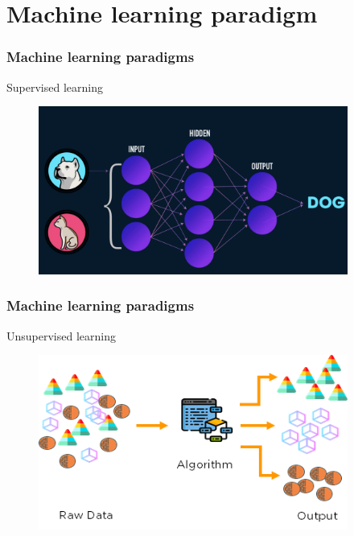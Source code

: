 \documentclass{beamer}
\begin{document}
\section{Machine learning paradigm}
\begin{frame}
\frametitle{Machine learning paradigms}
\begin{block}{Supervised learning}
\begin{figure}[H] %
   \centering
   \includegraphics[width=4in]{figures/supervise-learning.png} 
\end{figure}
\end{block}
\end{frame}
\begin{frame}
\frametitle{Machine learning paradigms}
\begin{block}{Unsupervised learning}
\begin{figure}[H] %
   \centering
   \includegraphics[width=4in]{figures/unsupervise-learning.png} 
\end{figure}
\end{block}
\end{frame}

\end{document}
